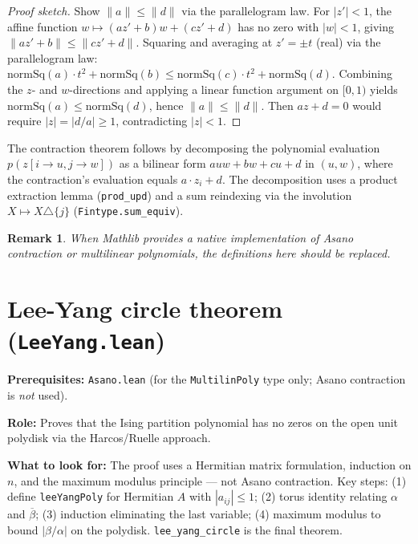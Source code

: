 \documentclass[a4paper,11pt]{article}
\newtheorem{remark}[theorem]{Remark}
\begin{document}
\begin{proof}[Proof sketch]
Show $\|a\| \leq \|d\|$ via the parallelogram law.
For $|z'| < 1$, the affine function $w \mapsto (az'+b)w + (cz'+d)$
has no zero with $|w| < 1$, giving $\|az'+b\| \leq \|cz'+d\|$.
Squaring and averaging at $z' = \pm t$ (real) via the parallelogram law:
$\mathrm{normSq}(a) \cdot t^2 + \mathrm{normSq}(b) \leq
\mathrm{normSq}(c) \cdot t^2 + \mathrm{normSq}(d)$.
Combining the $z$- and $w$-directions and applying a linear function argument
on $[0,1)$ yields $\mathrm{normSq}(a) \leq \mathrm{normSq}(d)$,
hence $\|a\| \leq \|d\|$. Then $az + d = 0$ would require
$|z| = |d/a| \geq 1$, contradicting $|z| < 1$.
\end{proof}

The contraction theorem follows by decomposing the polynomial evaluation
$p(z[i \to u, j \to w])$ as a bilinear form $auw + bw + cu + d$ in $(u, w)$,
where the contraction's evaluation equals $a \cdot z_i + d$.
The decomposition uses a product extraction lemma
(\texttt{prod\_upd}) and a sum reindexing via the involution
$X \mapsto X \triangle \{j\}$ (\texttt{Fintype.sum\_equiv}).

\begin{remark}
When Mathlib provides a native implementation of Asano contraction or
multilinear polynomials, the definitions here should be replaced.
\end{remark}

\section{Lee-Yang circle theorem (\texttt{LeeYang.lean})}

\par\noindent\textbf{Prerequisites:} \texttt{Asano.lean} (for the
\texttt{MultilinPoly} type only; Asano contraction is \emph{not} used).

\textbf{Role:} Proves that the Ising partition polynomial has no
zeros on the open unit polydisk via the Harcos/Ruelle approach.

\textbf{What to look for:} The proof uses a Hermitian matrix formulation,
induction on $n$, and the maximum modulus principle --- not Asano contraction.
Key steps: (1) define \texttt{leeYangPoly} for Hermitian $A$ with
$|a_{ij}| \le 1$; (2) torus identity relating $\alpha$ and
$\overline{\beta}$; (3) induction eliminating the last variable;
(4) maximum modulus to bound $|\beta/\alpha|$ on the polydisk.
\texttt{lee\_yang\_circle} is the final theorem.
\label{sec:lee-yang}
\end{document}
